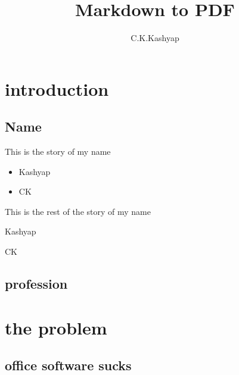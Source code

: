\documentclass{beamer}
\title[Markdown to PDF] %
    {Markdown to PDF}
\subtitle
    {}
\author[Kashyap] %
    {C.K.Kashyap}
\institute[IBM] %
    {
      International Business Machines\\
      Hyderabad}
\begin{document}
    \begin{frame}
      \titlepage
    \end{frame}





    \section{introduction}
	    \subsection{Name}
		    \begin{frame}{This is the story of my name}
		    	\begin{itemize}
				\item{Kashyap}
				\pause
				\item{CK}
			\end{itemize}
		    \end{frame}
		    \begin{frame}{This is the rest of the story of my name}
				\item{Kashyap}
				\pause
				\item{CK}
		    \end{frame}

    \subsection{profession}


\section{the problem}

\subsection{office software sucks}
\end{document}
